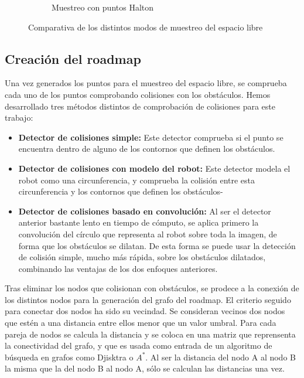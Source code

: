 \begin{figure}[b]
\begin{subfigure}[b]{0.3\textwidth}
                \caption{Muestreo con puntos Halton}
                \label{fig:muestreo_halton}
        \end{subfigure}
        \caption{Comparativa de los distintos modos de muestreo del espacio libre}\label{fig:muestreo}
\end{figure}

\subsection{Creación del roadmap}
Una vez generados los puntos para el muestreo del espacio libre, se comprueba cada uno de los puntos comprobando colisiones con los obstáculos. Hemos desarrollado tres métodos distintos de comprobación de colisiones para este trabajo:

\begin{itemize}
\item \textbf{Detector de colisiones simple: } Este detector comprueba si el punto se encuentra dentro de alguno de los contornos que definen los obstáculos.
\item \textbf{Detector de colisiones con modelo del robot: } Este detector modela el robot como una circunferencia, y comprueba la colisión entre esta circunferencia y los contornos que definen los obstáculos-
\item \textbf{Detector de colisiones basado en convolución: } Al ser el detector anterior bastante lento en tiempo de cómputo, se aplica primero la convolución del círculo que representa al robot sobre toda la imagen, de forma que los obstáculos se dilatan. De esta forma se puede usar la detección de colisión simple, mucho más rápida, sobre los obstáculos dilatados, combinando las ventajas de los dos enfoques anteriores.
\end{itemize}

Tras eliminar los nodos que colisionan con obstáculos, se prodece a la conexión de los distintos nodos para la generación del grafo del roadmap. El criterio seguido para conectar dos nodos ha sido su vecindad. Se consideran vecinos dos nodos que estén a una distancia entre ellos menor que un valor umbral. Para cada pareja de nodos se calcula la distancia y se coloca en una matriz que reprensenta la conectividad del grafo, y que es usada como entrada de un algoritmo de búsqueda en grafos como Djisktra o $A^*$. Al ser la distancia del nodo A al nodo B la misma que la del nodo B al nodo A, sólo se calculan las distancias una vez.\\

